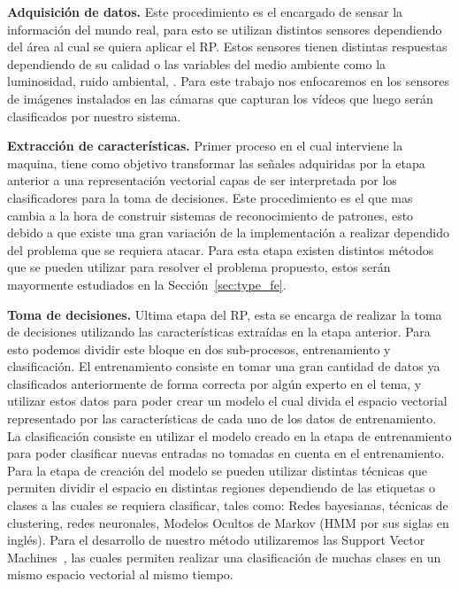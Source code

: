 	\textbf{Adquisición de datos.} Este procedimiento es el encargado de sensar la información del mundo real, para esto se utilizan distintos sensores dependiendo del área al cual se quiera aplicar el RP. Estos sensores tienen distintas respuestas dependiendo de su calidad o las variables del medio ambiente como la luminosidad, ruido ambiental, \etc. Para este trabajo nos enfocaremos en los sensores de imágenes instalados en las cámaras que capturan los vídeos que luego serán clasificados por nuestro sistema.
	
	\textbf{Extracción de características.} Primer proceso en el cual interviene la maquina, tiene como objetivo transformar las señales adquiridas por la etapa anterior a una representación vectorial capas de ser interpretada por los clasificadores para la toma de decisiones. Este procedimiento es el que mas cambia a la hora de construir sistemas de reconocimiento de patrones, esto debido a que existe una gran variación de la implementación a realizar dependido del problema que se requiera atacar. Para esta etapa existen distintos métodos que se pueden utilizar para resolver el problema propuesto, estos serán mayormente estudiados en la Sección~\ref{sec:type_fe}.
	
	\textbf{Toma de decisiones.} Ultima etapa del RP, esta se encarga de realizar la toma de decisiones utilizando las características extraídas en la etapa anterior. Para esto podemos dividir este bloque en dos sub-procesos, entrenamiento y clasificación. El entrenamiento consiste en tomar una gran cantidad de datos ya clasificados anteriormente de forma correcta por algún experto en el tema, y utilizar estos datos para poder crear un modelo el cual divida el espacio vectorial representado por las características de cada uno de los datos de entrenamiento. La clasificación consiste en utilizar el modelo creado en la etapa de entrenamiento para poder clasificar nuevas entradas no tomadas en cuenta en el entrenamiento. Para la etapa de creación del modelo se pueden utilizar distintas técnicas que permiten dividir el espacio en distintas regiones dependiendo de las etiquetas o clases a las cuales se requiera clasificar, tales como: Redes bayesianas, técnicas de clustering, redes neuronales, Modelos Ocultos de Markov (HMM por sus siglas en inglés). Para el desarrollo de nuestro método utilizaremos las Support Vector Machines~\cite{Cortes1995,Hearst1998}, las cuales permiten realizar una clasificación de muchas clases en un mismo espacio vectorial al mismo tiempo. 


